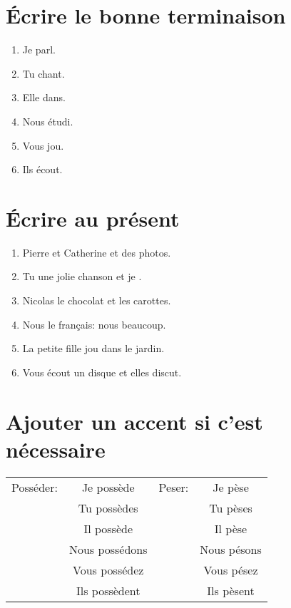 \section{Écrire le bonne terminaison}

\begin{enumerate}
    \item Je parl.
    \item Tu chant.
    \item Elle dans.
    \item Nous étudi.
    \item Vous jou.
    \item Ils écout.
\end{enumerate}

\section{Écrire au présent}

\begin{enumerate}
    \item Pierre et Catherine  et  des photos.
    \item Tu  une jolie chanson et je .
    \item Nicolas  le chocolat et  les carottes.
    \item Nous  le français: nous  beaucoup.
    \item La petite fille jou dans le jardin.
    \item Vous écout un disque et elles discut.
\end{enumerate}

\section{Ajouter un accent si c'est nécessaire}

\begin{center}
    \begin{tabular}{|c c|c c|}
        \hline
        Posséder: & Je possède & Peser: & Je pèse \\
        & Tu possèdes & & Tu pèses \\
        & Il possède & & Il pèse \\
        & Nous possédons & & Nous pésons \\
        & Vous possédez & & Vous pésez \\
        & Ils possèdent & & Ils pèsent \\
        \hline
    \end{tabular}
\end{center}

